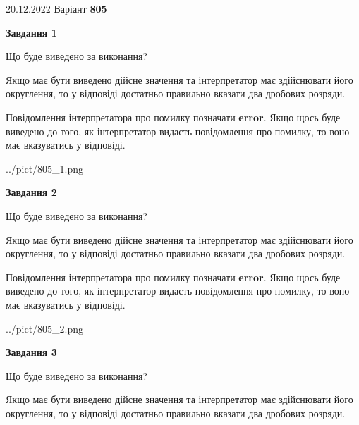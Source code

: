 \documentclass[12pt, ukrainian]{article}
\begin{document}
{20.12.2022 Варіант \No \textbf { 805 }\par}
{
\begin {Large}

{\begin {center}\textbf{Завдання 1}\end {center}}\par
Що буде виведено за виконання? \par

Якщо має бути виведено дійсне значення та інтерпретатор має здійснювати його округлення, 
то у відповіді достатньо правильно вказати два дробових розряди.

Повідомлення інтерпретатора про помилку позначати \textbf{error}.
Якщо щось буде виведено до того, як інтерпретатор видасть повідомлення про помилку, 
то воно має вказуватись у відповіді. \par

\begin{center}
	{../pict/805_1.png}
\end{center}
\newpage

{\begin {center}\textbf{Завдання 2}\end {center}}\par
Що буде виведено за виконання? \par

Якщо має бути виведено дійсне значення та інтерпретатор має здійснювати його округлення, 
то у відповіді достатньо правильно вказати два дробових розряди.

Повідомлення інтерпретатора про помилку позначати \textbf{error}.
Якщо щось буде виведено до того, як інтерпретатор видасть повідомлення про помилку, 
то воно має вказуватись у відповіді. \par

\begin{center}
	{../pict/805_2.png}
\end{center}
\newpage

{\begin {center}\textbf{Завдання 3}\end {center}}\par
Що буде виведено за виконання? \par

Якщо має бути виведено дійсне значення та інтерпретатор має здійснювати його округлення, 
то у відповіді достатньо правильно вказати два дробових розряди.


\end{Large}}
\end{document}
